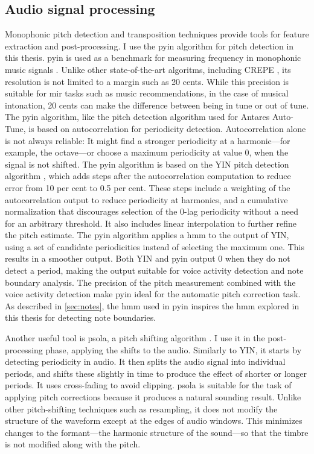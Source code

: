 \subsection{Audio signal processing}
Monophonic pitch detection and transposition techniques provide tools for feature extraction and post-processing. I use the \gls{pyin} algorithm \cite{mauch2014pyin} for pitch detection in this thesis. \gls{pyin} is used as a benchmark for measuring frequency in monophonic music signals \cite{devaney2020new}. Unlike other state-of-the-art algoritms, including CREPE \cite{kim2018crepe}, its resolution is not limited to a margin such as 20 cents. While this precision is suitable for \gls{mir} tasks such as music recommendations, in the case of musical intonation, 20 cents can make the difference between being in tune or out of tune. The \gls{pyin} algorithm, like the pitch detection algorithm used for Antares Auto-Tune, is based on autocorrelation for periodicity detection. Autocorrelation alone is not always reliable: It might find a stronger periodicity at a harmonic---for example, the octave---or choose a maximum periodicity at value 0, when the signal is not shifted. The \gls{pyin} algorithm is based on the YIN pitch detection algorithm \cite{de2002yin}, which adds steps after the autocorrelation computation to reduce error from 10 per cent to 0.5 per cent. These steps include a weighting of the autocorrelation output to reduce periodicity at harmonics, and a cumulative normalization that discourages selection of the 0-lag periodicity without a need for an arbitrary threshold. It also includes linear interpolation to further refine the pitch estimate. The \gls{pyin} algorithm applies a \gls{hmm} to the output of YIN, using a set of candidate periodicities instead of selecting the maximum one. This results in a smoother output. Both YIN and \gls{pyin} output 0 when they do not detect a period, making the output suitable for voice activity detection and note boundary analysis. The precision of the pitch measurement combined with the voice activity detection make \gls{pyin} ideal for the automatic pitch correction task. As described in \ref{sec:notes}, the \gls{hmm} used in \gls{pyin} inspires the \gls{hmm} explored in this thesis for detecting note boundaries. 

Another useful tool is \gls{psola}, a pitch shifting algorithm \cite{charpentier1986diphone}. I use it in the post-processing phase, applying the shifts to the audio. Similarly to YIN, it starts by detecting periodicity in audio. It then splits the audio signal into individual periods, and shifts these slightly in time to produce the effect of shorter or longer periods. It uses cross-fading to avoid clipping. \gls{psola} is suitable for the task of applying pitch corrections because it produces a natural sounding result. Unlike other pitch-shifting techniques such as resampling, it does not modify the structure of the waveform except at the edges of audio windows. This minimizes changes to the formant---the harmonic structure of the sound---so that the timbre is not modified along with the pitch. 

